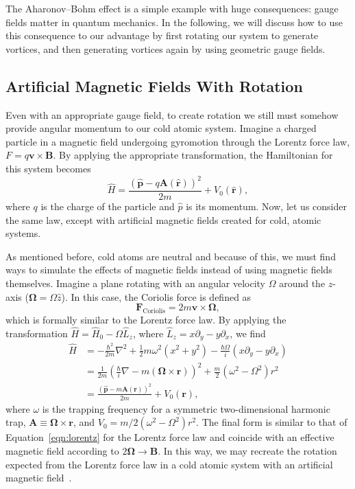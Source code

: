 The Aharonov--Bohm effect is a simple example with huge consequences: gauge fields matter in quantum mechanics. 
In the following, we will discuss how to use this consequence to our advantage by first rotating our system to generate vortices, and then generating vortices again by using geometric gauge fields.

\subsection{Artificial Magnetic Fields With Rotation}
\label{sec:rot}

Even with an appropriate gauge field, to create rotation we still must somehow provide angular momentum to our cold atomic system.
Imagine a charged particle in a magnetic field undergoing gyromotion through the Lorentz force law, $F=q\mathbf{v} \times \mathbf{B}$.
By applying the appropriate transformation, the Hamiltonian for this system becomes
\begin{equation}
\hat H = \frac{(\hat{\mathbf{p}} - q \mathbf{A}(\hat{\mathbf{r}}))^2}{2m} + V_0(\hat{\mathbf{r}}),
\label{eqn:lorentz}
\end{equation}
where $q$ is the charge of the particle and $\hat p$ is its momentum.
Now, let us consider the same law, except with artificial magnetic fields created for cold, atomic systems.

As mentioned before, cold atoms are neutral and because of this, we must find ways to simulate the effects of magnetic fields instead of using magnetic fields themselves.
Imagine a plane rotating with an angular velocity $\Omega$ around the $z$-axis ($\mathbf{\Omega} = \Omega \hat z$). 
In this case, the Coriolis force is defined as
\begin{equation}
\mathbf{F}_{\text{Coriolis}} = 2m \mathbf{v} \times \mathbf{\Omega},
\end{equation}
which is formally similar to the Lorentz force law.
By applying the transformation $\hat H = \hat H_0 - \Omega \hat L_z$, where $\hat L_z = x\partial_y - y\partial_x$, we find~\cite{Bhat2008}
\begin{equation}
\begin{split}
\hat H &= -\frac{\hbar^2}{2m}\nabla^2 + \frac 1 2 m \omega^2(x^2 + y^2) - \frac{\hbar \Omega}{i}(x\partial_y - y\partial_x) \\
 &= \frac{1}{2m}\left(\frac{\hbar}{i}\nabla - m(\mathbf{\Omega} \times \mathbf{r})\right)^2 + \frac m 2 \left( \omega^2 - \Omega^2 \right)r^2 \\
 &= \frac{(\hat{\mathbf{p}}-m\mathbf{A}(\mathbf{r}))^2}{2m}+ V_0(\mathbf{r}),
\end{split}
\end{equation}
where $\omega$ is the trapping frequency for a symmetric two-dimensional harmonic trap, $\mathbf{A} \equiv \mathbf{\Omega} \times \mathbf{r}$, and $V_0 = m/2 \left( \omega^2 - \Omega^2 \right)r^2$.
The final form is similar to that of Equation~\eqref{eqn:lorentz} for the Lorentz force law and coincide with an effective magnetic field according to $2 \mathbf \Omega \rightarrow \mathbf B$.
In this way, we may recreate the rotation expected from the Lorentz force law in a cold atomic system with an artificial magnetic field~\cite{Peshkin1989, Madison2000, Abo-Shaeer2001}.

